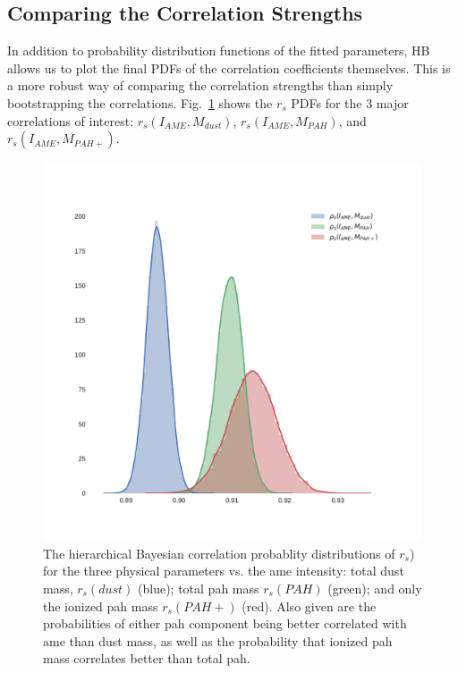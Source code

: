     \subsection{Comparing the Correlation Strengths}

    In addition to probability distribution functions of the fitted parameters, HB allows us to plot the final PDFs of the correlation coefficients themselves. This is a more robust way of comparing the correlation strengths than simply bootstrapping the correlations. Fig.~\ref{fig:PDFs_Iame} shows the $r_{s}$  PDFs for the 3 major correlations of interest: $r_{s}(I_{AME},M_{dust})$, $r_{s}(I_{AME},M_{PAH})$, and $r_{s}(I_{AME},M_{PAH+})$.
        \begin{figure}
          \includegraphics[width=\textwidth]{../Plots/ch_lori/PDFs_Iame.pdf}
          \centering
          \caption{ The hierarchical Bayesian correlation probablity distributions of $r_{s}$) for the three physical parameters vs. the \gls{ame} intensity: total dust mass, $r_{s}(dust)$ (blue); total \gls{pah} mass $r_{s}(PAH)$ (green); and only the ionized \gls{pah} mass $r_{s}(PAH+)$ (red). Also given are the probabilities of either \gls{pah} component being better correlated with \gls{ame} than dust mass, as well as the probability that ionized \gls{pah} mass correlates better than total \gls{pah}.}
          \label{fig:PDFs_Iame}
        \end{figure}
